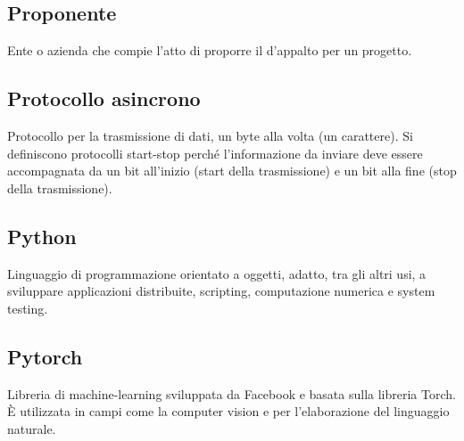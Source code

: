 \subsection*{Proponente}
Ente o azienda che compie l'atto di proporre il  d’appalto per un progetto.

\subsection*{Protocollo asincrono}
Protocollo per la trasmissione di dati, un byte alla volta (un carattere). Si definiscono protocolli start-stop perché l'informazione da inviare deve essere accompagnata da un bit all'inizio (start della trasmissione) e un bit alla fine (stop della trasmissione).

\subsection*{Python}
Linguaggio di programmazione orientato a oggetti, adatto, tra gli altri usi, a sviluppare applicazioni distribuite, scripting, computazione numerica e system testing.

\subsection*{Pytorch}
Libreria  di machine-learning sviluppata da Facebook e basata sulla libreria Torch. È utilizzata in campi come la computer vision e per l'elaborazione del linguaggio naturale.

